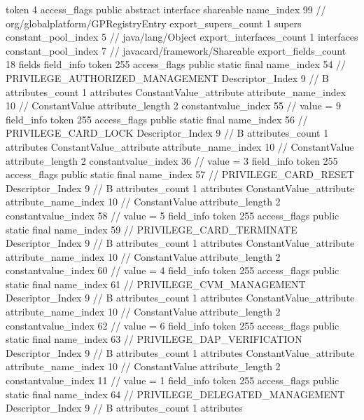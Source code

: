 {{{			token	4
			access_flags	public abstract interface shareable
			name_index	99		// org/globalplatform/GPRegistryEntry
			export_supers_count	1
			supers {
				constant_pool_index	5		// java/lang/Object
			}
			export_interfaces_count	1
			interfaces {
				constant_pool_index	7		// javacard/framework/Shareable
			}
			export_fields_count	18
			fields {
			field_info {
				token	255
				access_flags	public static final
				name_index	54		// PRIVILEGE_AUTHORIZED_MANAGEMENT
				Descriptor_Index	9		// B
				attributes_count	1
				attributes {
				ConstantValue_attribute {
					attribute_name_index	10		// ConstantValue
					attribute_length	2
					constantvalue_index	55		// value = 9
				}
				}
			}
			field_info {
				token	255
				access_flags	public static final
				name_index	56		// PRIVILEGE_CARD_LOCK
				Descriptor_Index	9		// B
				attributes_count	1
				attributes {
				ConstantValue_attribute {
					attribute_name_index	10		// ConstantValue
					attribute_length	2
					constantvalue_index	36		// value = 3
				}
				}
			}
			field_info {
				token	255
				access_flags	public static final
				name_index	57		// PRIVILEGE_CARD_RESET
				Descriptor_Index	9		// B
				attributes_count	1
				attributes {
				ConstantValue_attribute {
					attribute_name_index	10		// ConstantValue
					attribute_length	2
					constantvalue_index	58		// value = 5
				}
				}
			}
			field_info {
				token	255
				access_flags	public static final
				name_index	59		// PRIVILEGE_CARD_TERMINATE
				Descriptor_Index	9		// B
				attributes_count	1
				attributes {
				ConstantValue_attribute {
					attribute_name_index	10		// ConstantValue
					attribute_length	2
					constantvalue_index	60		// value = 4
				}
				}
			}
			field_info {
				token	255
				access_flags	public static final
				name_index	61		// PRIVILEGE_CVM_MANAGEMENT
				Descriptor_Index	9		// B
				attributes_count	1
				attributes {
				ConstantValue_attribute {
					attribute_name_index	10		// ConstantValue
					attribute_length	2
					constantvalue_index	62		// value = 6
				}
				}
			}
			field_info {
				token	255
				access_flags	public static final
				name_index	63		// PRIVILEGE_DAP_VERIFICATION
				Descriptor_Index	9		// B
				attributes_count	1
				attributes {
				ConstantValue_attribute {
					attribute_name_index	10		// ConstantValue
					attribute_length	2
					constantvalue_index	11		// value = 1
				}
				}
			}
			field_info {
				token	255
				access_flags	public static final
				name_index	64		// PRIVILEGE_DELEGATED_MANAGEMENT
				Descriptor_Index	9		// B
				attributes_count	1
				attributes {
}}}}}}

